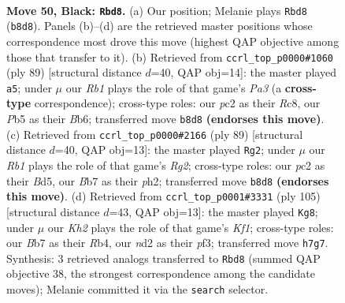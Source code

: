 \documentclass[11pt]{article}
\begin{document}
\clearpage

\begin{figure}[p]\centering
\begin{subfigure}{0.46\textwidth}\centering
\resizebox{\linewidth}{!}{%
\newchessgame
\chessboard[
  setfen={1r2r3/1b3p1k/6p1/Rp6/7P/1P6/2PN1K2/R2B4 b - - 1 50},
  showmover=false,
  pgfstyle=straightmove, color=movearrow, markmove={b8-d8}
]}
\caption{}
\end{subfigure}\hfill
\begin{subfigure}{0.46\textwidth}\centering
\resizebox{\linewidth}{!}{%
\newchessgame
\chessboard[
  setfen={2r4k/7p/pbr5/8/1R3N2/8/P1P1R2P/7K b - - 14 45},
  showmover=false,
  pgfstyle=straightmove, color=movearrow, markmove={a6-a5}
]}
\caption{}
\end{subfigure}
\\[4pt]
\begin{subfigure}{0.46\textwidth}\centering
\resizebox{\linewidth}{!}{%
\newchessgame
\chessboard[
  setfen={8/p1r3r1/4pk2/1P1b3p/R4P2/R2BK3/7P/8 b - - 1 45},
  showmover=false,
  pgfstyle=straightmove, color=movearrow, markmove={g7-g2}
]}
\caption{}
\end{subfigure}\hfill
\begin{subfigure}{0.46\textwidth}\centering
\resizebox{\linewidth}{!}{%
\newchessgame
\chessboard[
  setfen={1r3k2/R6R/5p2/7p/1r2P2P/5P2/1p4PK/8 b - - 5 53},
  showmover=false,
  pgfstyle=straightmove, color=movearrow, markmove={f8-g8}
]}
\caption{}
\end{subfigure}
\caption{\textbf{Move 50, Black: \texttt{Rbd8}.} (a) Our position; Melanie plays \texttt{Rbd8} (\texttt{b8d8}). Panels (b)--(d) are the retrieved master positions whose correspondence most drove this move (highest QAP objective among those that transfer to it). (b) Retrieved from \texttt{ccrl\_top\_p0000\#1060} (ply 89) [structural distance $d$=40, QAP obj=14]: the master played \texttt{a5}; under $\mu$ our \emph{Rb1} plays the role of that game's \emph{Pa3} (a \textbf{cross-type} correspondence); cross-type roles: our \emph{p}c2 as their \emph{R}c8, our \emph{P}b5 as their \emph{B}b6; transferred move \texttt{b8d8} \textbf{(endorses this move)}. (c) Retrieved from \texttt{ccrl\_top\_p0000\#2166} (ply 89) [structural distance $d$=40, QAP obj=13]: the master played \texttt{Rg2}; under $\mu$ our \emph{Rb1} plays the role of that game's \emph{Rg2}; cross-type roles: our \emph{p}c2 as their \emph{B}d5, our \emph{B}b7 as their \emph{p}h2; transferred move \texttt{b8d8} \textbf{(endorses this move)}. (d) Retrieved from \texttt{ccrl\_top\_p0001\#3331} (ply 105) [structural distance $d$=43, QAP obj=13]: the master played \texttt{Kg8}; under $\mu$ our \emph{Kh2} plays the role of that game's \emph{Kf1}; cross-type roles: our \emph{B}b7 as their \emph{R}b4, our \emph{n}d2 as their \emph{p}f3; transferred move \texttt{h7g7}. Synthesis: 3 retrieved analogs transferred to \texttt{Rbd8} (summed QAP objective 38, the strongest correspondence among the candidate moves); Melanie committed it via the \texttt{search} selector.}
\label{fig:thought-m99}
\end{figure}
\end{document}
